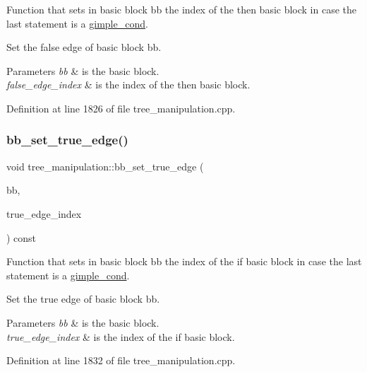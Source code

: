 Function that sets in basic block bb the index of the then basic block in case the last statement is a \hyperlink{structgimple__cond}{gimple\+\_\+cond}. 

Set the false edge of basic block bb.


\begin{DoxyParams}{Parameters}
{\em bb} & is the basic block. \\
\hline
{\em false\+\_\+edge\+\_\+index} & is the index of the then basic block. \\
\hline
\end{DoxyParams}


Definition at line 1826 of file tree\+\_\+manipulation.\+cpp.

\mbox{\label{classtree__manipulation_a9e0cb6c2ecaf64f82328d1c837ef43f9}} 
\subsubsection{\texorpdfstring{bb\+\_\+set\+\_\+true\+\_\+edge()}{bb\_set\_true\_edge()}}
{\footnotesize\ttfamily void tree\+\_\+manipulation\+::bb\+\_\+set\+\_\+true\+\_\+edge (\begin{DoxyParamCaption}\item[{bloc\+Ref \&}]{bb,  }\item[{const unsigned int \&}]{true\+\_\+edge\+\_\+index }\end{DoxyParamCaption}) const}



Function that sets in basic block bb the index of the if basic block in case the last statement is a \hyperlink{structgimple__cond}{gimple\+\_\+cond}. 

Set the true edge of basic block bb.


\begin{DoxyParams}{Parameters}
{\em bb} & is the basic block. \\
\hline
{\em true\+\_\+edge\+\_\+index} & is the index of the if basic block. \\
\hline
\end{DoxyParams}


Definition at line 1832 of file tree\+\_\+manipulation.\+cpp.

